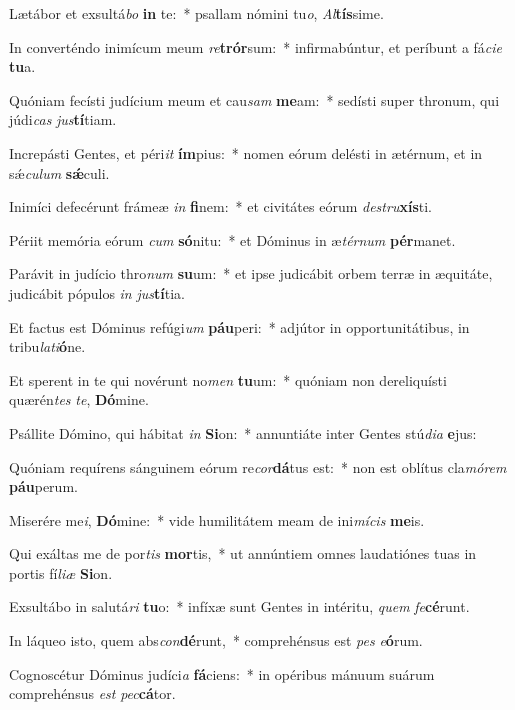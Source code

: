 \item Lætábor et exsultá\textit{bo} \textbf{in} te:~* psallam nómini tu\textit{o}, \textit{Al}\textbf{tís}sime.
\item In converténdo inimícum meum \textit{re}\textbf{trór}sum:~* infirmabúntur, et períbunt a fá\textit{ci}\textit{e} \textbf{tu}a.
\item Quóniam fecísti judícium meum et cau\textit{sam} \textbf{me}am:~* sedísti super thronum, qui júdi\textit{cas} \textit{jus}\textbf{tí}tiam.
\item Increpásti Gentes, et péri\textit{it} \textbf{ím}pius:~* nomen eórum delésti in ætérnum, et in sǽ\textit{cu}\textit{lum} \textbf{sǽ}culi.
\item Inimíci defecérunt frámeæ \textit{in} \textbf{fi}nem:~* et civitátes eórum \textit{de}\textit{stru}\textbf{xís}ti.
\item Périit memória eórum \textit{cum} \textbf{só}nitu:~* et Dóminus in æ\textit{tér}\textit{num} \textbf{pér}manet.
\item Parávit in judício thro\textit{num} \textbf{su}um:~* et ipse judicábit orbem terræ in æquitáte, judicábit pópulos \textit{in} \textit{jus}\textbf{tí}tia.
\item Et factus est Dóminus refúgi\textit{um} \textbf{páu}peri:~* adjútor in opportunitátibus, in tribu\textit{la}\textit{ti}\textbf{ó}ne.
\item Et sperent in te qui novérunt no\textit{men} \textbf{tu}um:~* quóniam non dereliquísti quærén\textit{tes} \textit{te}, \textbf{Dó}mine.
\item Psállite Dómino, qui hábitat \textit{in} \textbf{Si}on:~* annuntiáte inter Gentes stú\textit{di}\textit{a} \textbf{e}jus:
\item Quóniam requírens sánguinem eórum re\textit{cor}\textbf{dá}tus est:~* non est oblítus cla\textit{mó}\textit{rem} \textbf{páu}perum.
\item Miserére me\textit{i}, \textbf{Dó}mine:~* vide humilitátem meam de ini\textit{mí}\textit{cis} \textbf{me}is.
\item Qui exáltas me de por\textit{tis} \textbf{mor}tis,~* ut annúntiem omnes laudatiónes tuas in portis fí\textit{li}\textit{æ} \textbf{Si}on.
\item Exsultábo in salutá\textit{ri} \textbf{tu}o:~* infíxæ sunt Gentes in intéritu, \textit{quem} \textit{fe}\textbf{cé}runt.
\item In láqueo isto, quem abs\textit{con}\textbf{dé}runt,~* comprehénsus est \textit{pes} \textit{e}\textbf{ó}rum.
\item Cognoscétur Dóminus judíci\textit{a} \textbf{fá}ciens:~* in opéribus mánuum suárum comprehénsus \textit{est} \textit{pec}\textbf{cá}tor.
